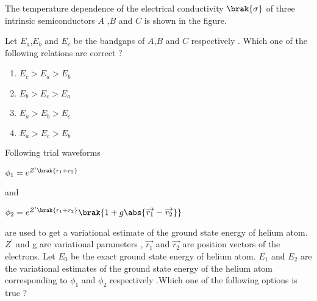 \iffalse
\title{PH-2024-27-39}
\author{EE24BTECH11036 - Krishna Patil}
\section{ph}
\chapter{2024}
\fi
\item The temperature dependence of the electrical conductivity $\brak{\sigma}$ of three intrinsic semiconductors $ A$ ,$B$ and $C$ is shown in the figure.
\begin{figure}[!ht]
\centering
{}
\label{fig:my_label}
\end{figure}
Let $E_a$,$E_b$ and $E_c$ be the bandgaps of $A$,$B$ and $C$ respectively . Which one of the following relations are correct ? 
\begin{enumerate}
\item $E_c>E_a>E_b$
\item $E_b>E_c>E_a$ 
\item $E_a>E_b>E_c$
\item $E_a>E_c>E_b$
\end{enumerate}
\item Following trial waveforms \begin{center} $\phi_1 =e^{Z^{\prime}\brak{r_1+r_2}}$ \end{center}  and \begin{center} $\phi_2 =e^{Z^{\prime}\brak{r_1+r_2}}\brak{1+g\abs{\overrightarrow{r_1}-\overrightarrow{r_2}}}$ \end{center} are used to get a variational estimate of the ground state energy of helium atom. $Z^{\prime}$ and g are variational parameters , $\overrightarrow{r_1}$ and $\overrightarrow{r_2}$ are position vectors of the electrons. Let $E_0$ be the exact ground state energy of helium atom. $E_1$ and $E_2$ are the variational estimates of the ground state energy of the helium atom corresponding to $\phi_1$ and $\phi_2$ respectively .Which one of the following options is true ?
